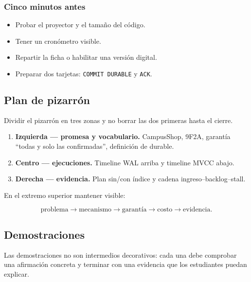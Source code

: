 \documentclass[variant=docente,cover=institutional,mode=screen]{ua-engineering-v6-article}
\begin{document}
\subsubsection*{Cinco minutos antes}

\begin{itemize}
\item Probar el proyector y el tamaño del código.
\item Tener un cronómetro visible.
\item Repartir la ficha o habilitar una versión digital.
\item Preparar dos tarjetas: \texttt{COMMIT DURABLE} y \texttt{ACK}.
\end{itemize}

\subsection{Plan de pizarrón}

Dividir el pizarrón en tres zonas y no borrar las dos primeras hasta el cierre.

\begin{enumerate}
\item \textbf{Izquierda --- promesa y vocabulario.} CampusShop, 9F2A, garantía ``todas y solo las confirmadas'', definición de durable.
\item \textbf{Centro --- ejecuciones.} Timeline WAL arriba y timeline MVCC abajo.
\item \textbf{Derecha --- evidencia.} Plan sin/con índice y cadena ingreso--backlog--stall.
\end{enumerate}

En el extremo superior mantener visible:

\[
\text{problema} \rightarrow \text{mecanismo} \rightarrow
\text{garantía} \rightarrow \text{costo} \rightarrow \text{evidencia}.
\]

\subsection{Demostraciones}

Las demostraciones no son intermedios decorativos: cada una debe comprobar una afirmación concreta y terminar con una evidencia que los estudiantes puedan explicar.
\end{document}
